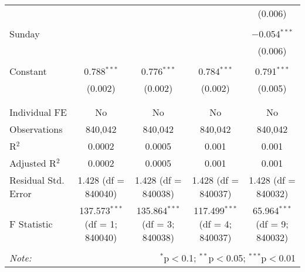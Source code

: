 \documentclass[
]{article}
\begin{document}
\begin{table}[!htbp]
{\begin{tabular}{@{\extracolsep{5pt}}lcccc}
  &  &  &  & (0.006) \\ 
  & & & & \\ 
 Sunday &  &  &  & $-$0.054$^{***}$ \\ 
  &  &  &  & (0.006) \\ 
  & & & & \\ 
 Constant & 0.788$^{***}$ & 0.776$^{***}$ & 0.784$^{***}$ & 0.791$^{***}$ \\ 
  & (0.002) & (0.002) & (0.002) & (0.005) \\ 
  & & & & \\ 
\hline \\[-1.8ex] 
Individual FE & No & No & No & No \\ 
Observations & 840,042 & 840,042 & 840,042 & 840,042 \\ 
R$^{2}$ & 0.0002 & 0.0005 & 0.001 & 0.001 \\ 
Adjusted R$^{2}$ & 0.0002 & 0.0005 & 0.001 & 0.001 \\ 
Residual Std. Error & 1.428 (df = 840040) & 1.428 (df = 840038) & 1.428 (df = 840037) & 1.428 (df = 840032) \\ 
F Statistic & 137.573$^{***}$ (df = 1; 840040) & 135.864$^{***}$ (df = 3; 840038) & 117.499$^{***}$ (df = 4; 840037) & 65.964$^{***}$ (df = 9; 840032) \\ 
\hline 
\hline \\[-1.8ex] 
\textit{Note:}  & \multicolumn{4}{r}{$^{*}$p$<$0.1; $^{**}$p$<$0.05; $^{***}$p$<$0.01} \\ 
\end{tabular}
} 
\end{table} 
\newpage
\end{document}
